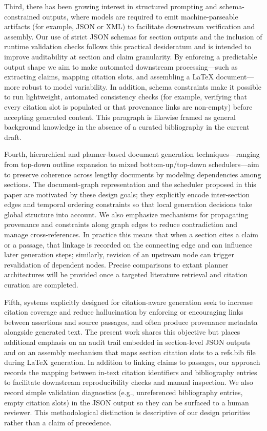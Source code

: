Third, there has been growing interest in structured prompting and schema-constrained outputs, where models are required to emit machine-parseable artifacts (for example, JSON or XML) to facilitate downstream verification and assembly. Our use of strict JSON schemas for section outputs and the inclusion of runtime validation checks follows this practical desideratum and is intended to improve auditability at section and claim granularity. By enforcing a predictable output shape we aim to make automated downstream processing—such as extracting claims, mapping citation slots, and assembling a LaTeX document—more robust to model variability. In addition, schema constraints make it possible to run lightweight, automated consistency checks (for example, verifying that every citation slot is populated or that provenance links are non-empty) before accepting generated content. This paragraph is likewise framed as general background knowledge in the absence of a curated bibliography in the current draft.

Fourth, hierarchical and planner-based document generation techniques—ranging from top-down outline expansion to mixed bottom-up/top-down schedulers—aim to preserve coherence across lengthy documents by modeling dependencies among sections. The document-graph representation and the scheduler proposed in this paper are motivated by these design goals; they explicitly encode inter-section edges and temporal ordering constraints so that local generation decisions take global structure into account. We also emphasize mechanisms for propagating provenance and constraints along graph edges to reduce contradiction and manage cross-references. In practice this means that when a section cites a claim or a passage, that linkage is recorded on the connecting edge and can influence later generation steps; similarly, revision of an upstream node can trigger revalidation of dependent nodes. Precise comparisons to extant planner architectures will be provided once a targeted literature retrieval and citation curation are completed.

Fifth, systems explicitly designed for citation-aware generation seek to increase citation coverage and reduce hallucination by enforcing or encouraging links between assertions and source passages, and often produce provenance metadata alongside generated text. The present work shares this objective but places additional emphasis on an audit trail embedded in section-level JSON outputs and on an assembly mechanism that maps section citation slots to a refs.bib file during LaTeX generation. In addition to linking claims to passages, our approach records the mapping between in-text citation identifiers and bibliography entries to facilitate downstream reproducibility checks and manual inspection. We also record simple validation diagnostics (e.g., unreferenced bibliography entries, empty citation slots) in the JSON output so they can be surfaced to a human reviewer. This methodological distinction is descriptive of our design priorities rather than a claim of precedence.


